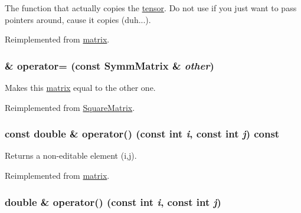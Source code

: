 The function that actually copies the \hyperlink{classJKBuilder_1_1tensor}{tensor}. Do not use if you just want to pass pointers around, cause it copies (duh...). 

Reimplemented from \hyperlink{classJKBuilder_1_1matrix_a75177328107f96ec679d43fce0a9e866}{matrix}.\hypertarget{classJKBuilder_1_1SymmMatrix_aca4a8297278ff39c5422febf1dcbc5ac}{
\subsubsection[{operator=}]{ \& operator= (const {\bf SymmMatrix} \& {\em other})}}
\label{classJKBuilder_1_1SymmMatrix_aca4a8297278ff39c5422febf1dcbc5ac}


Makes this \hyperlink{classJKBuilder_1_1matrix}{matrix} equal to the other one. 

Reimplemented from \hyperlink{classJKBuilder_1_1SquareMatrix_ad78e5a12d26f1984d77a57095bc4d181}{SquareMatrix}.\hypertarget{classJKBuilder_1_1SymmMatrix_a9ccbac42f4eefb704f04886001f4fb3e}{
\subsubsection[{operator()}]{\setlength{\rightskip}{0pt plus 5cm}const double \& operator() (const int {\em i}, \/  const int {\em j}) const}}
\label{classJKBuilder_1_1SymmMatrix_a9ccbac42f4eefb704f04886001f4fb3e}


Returns a non-\/editable element (i,j). 

Reimplemented from \hyperlink{classJKBuilder_1_1matrix_a9ccbac42f4eefb704f04886001f4fb3e}{matrix}.\hypertarget{classJKBuilder_1_1SymmMatrix_a3d7fca183ff1c9f4c160218746f2ef31}{
\subsubsection[{operator()}]{\setlength{\rightskip}{0pt plus 5cm}double \& operator() (const int {\em i}, \/  const int {\em j})}}
\label{classJKBuilder_1_1SymmMatrix_a3d7fca183ff1c9f4c160218746f2ef31}


